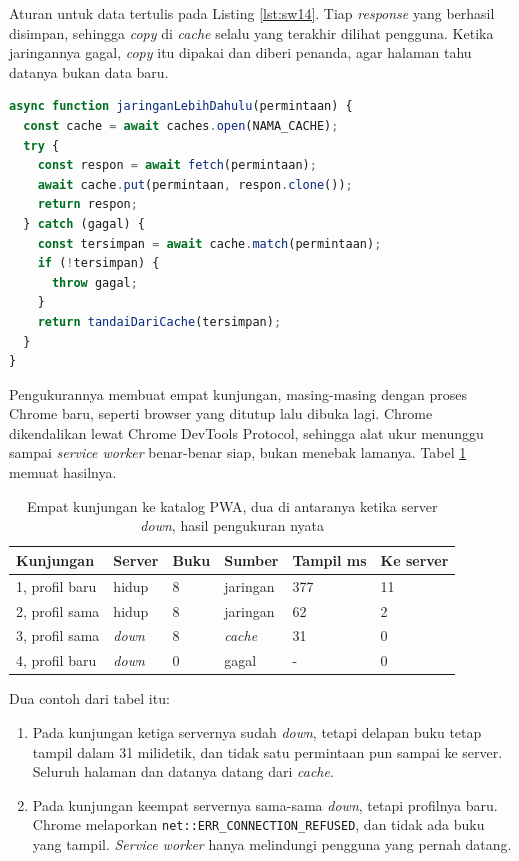 Aturan untuk data tertulis pada Listing \ref{lst:sw14}. Tiap \textit{response}
yang berhasil disimpan, sehingga \textit{copy} di \textit{cache} selalu yang terakhir
dilihat pengguna. Ketika jaringannya gagal, \textit{copy} itu dipakai dan diberi
penanda, agar halaman tahu datanya bukan data baru.

\begin{lstlisting}[language=TypeScript, caption={Jaringan lebih dahulu, \textit{copy} terakhir bila gagal, tersedia di \berkas{sources/chapter14/statis/sw.js}}, label={lst:sw14}]
async function jaringanLebihDahulu(permintaan) {
  const cache = await caches.open(NAMA_CACHE);
  try {
    const respon = await fetch(permintaan);
    await cache.put(permintaan, respon.clone());
    return respon;
  } catch (gagal) {
    const tersimpan = await cache.match(permintaan);
    if (!tersimpan) {
      throw gagal;
    }
    return tandaiDariCache(tersimpan);
  }
}
\end{lstlisting}

Pengukurannya membuat empat kunjungan, masing-masing dengan proses Chrome
baru, seperti browser yang ditutup lalu dibuka lagi. Chrome dikendalikan
lewat Chrome DevTools Protocol, sehingga alat ukur menunggu sampai
\textit{service worker} benar-benar siap, bukan menebak lamanya. Tabel
\ref{tab:offline14} memuat hasilnya.

\begin{table}[!htb]
  \centering
  \caption{Empat kunjungan ke katalog PWA, dua di antaranya ketika server
           \textit{down}, hasil pengukuran nyata}
  \label{tab:offline14}
  \begin{tabularx}{\textwidth}{Xlllll}
    \hline
    \textbf{Kunjungan} & \textbf{Server} & \textbf{Buku} & \textbf{Sumber} & \textbf{Tampil ms} & \textbf{Ke server} \\
    \hline
    1, profil baru & hidup & 8 & jaringan & 377 & 11 \\
    \hline
    2, profil sama & hidup & 8 & jaringan & 62 & 2 \\
    \hline
    3, profil sama & \textit{down} & 8 & \textit{cache} & 31 & 0 \\
    \hline
    4, profil baru & \textit{down} & 0 & gagal & - & 0 \\
    \hline
  \end{tabularx}
\end{table}

Dua contoh dari tabel itu:
\begin{enumerate}
  \item Pada kunjungan ketiga servernya sudah \textit{down}, tetapi delapan buku tetap
        tampil dalam 31 milidetik, dan tidak satu permintaan pun sampai ke
        server. Seluruh halaman dan datanya datang dari \textit{cache}.
  \item Pada kunjungan keempat servernya sama-sama \textit{down}, tetapi profilnya
        baru. Chrome melaporkan \texttt{net::ERR\_CONNECTION\_REFUSED}, dan
        tidak ada buku yang tampil. \textit{Service worker} hanya melindungi
        pengguna yang pernah datang.
\end{enumerate}

